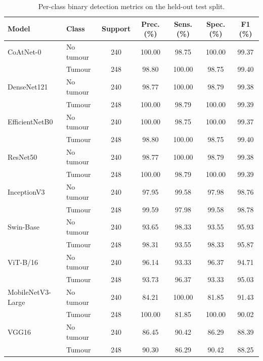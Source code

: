 \documentclass[11pt]{article}
\newcommand{\tablenumber}[1]{\setcounter{table}{\numexpr#1-1\relax}}
\begin{document}
\begin{table}[htbp]
\tablenumber{4}
\centering
\caption{Per-class binary detection metrics on the held-out test split.}
\label{tab:s4}
\small
\begin{tabular*}{\textwidth}{@{\extracolsep{\fill}}llccccc@{}}
\toprule
Model & Class & Support & Prec. (\%) & Sens. (\%) & Spec. (\%) & F1 (\%) \\
\midrule
CoAtNet-0 & No tumour & 240 & 100.00 & 98.75 & 100.00 & 99.37 \\
 & Tumour & 248 & 98.80 & 100.00 & 98.75 & 99.40 \\
\midrule
DenseNet121 & No tumour & 240 & 98.77 & 100.00 & 98.79 & 99.38 \\
 & Tumour & 248 & 100.00 & 98.79 & 100.00 & 99.39 \\
\midrule
EfficientNetB0 & No tumour & 240 & 100.00 & 98.75 & 100.00 & 99.37 \\
 & Tumour & 248 & 98.80 & 100.00 & 98.75 & 99.40 \\
\midrule
ResNet50 & No tumour & 240 & 98.77 & 100.00 & 98.79 & 99.38 \\
 & Tumour & 248 & 100.00 & 98.79 & 100.00 & 99.39 \\
\midrule
InceptionV3 & No tumour & 240 & 97.95 & 99.58 & 97.98 & 98.76 \\
 & Tumour & 248 & 99.59 & 97.98 & 99.58 & 98.78 \\
\midrule
Swin-Base & No tumour & 240 & 93.65 & 98.33 & 93.55 & 95.93 \\
 & Tumour & 248 & 98.31 & 93.55 & 98.33 & 95.87 \\
\midrule
ViT-B/16 & No tumour & 240 & 96.14 & 93.33 & 96.37 & 94.71 \\
 & Tumour & 248 & 93.73 & 96.37 & 93.33 & 95.03 \\
\midrule
MobileNetV3-Large & No tumour & 240 & 84.21 & 100.00 & 81.85 & 91.43 \\
 & Tumour & 248 & 100.00 & 81.85 & 100.00 & 90.02 \\
\midrule
VGG16 & No tumour & 240 & 86.45 & 90.42 & 86.29 & 88.39 \\
 & Tumour & 248 & 90.30 & 86.29 & 90.42 & 88.25 \\
\bottomrule
\end{tabular*}
\end{table}
\end{document}
